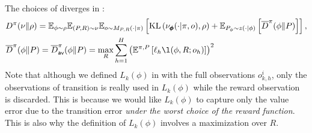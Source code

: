 \begin{algorithm}[H]
{\begin{align}
        \end{align}
    }
\end{algorithm}

The choices of diverges in : 
\begin{align}
    &D^\pi(\nu\|\rho) = \E_{\phi\sim \rho}\E_{(P,R) \sim \nu}\E_{o \sim M_{P,R}(\cdot|\pi)}\left[\KL\left(\nu_{\bo{\phi}}(\cdot|\pi, o), \rho\right) + \E_{P_\phi\sim z(\cdot|\phi)}\left[\tilD^\pi(\phi\|P) \right]\right]  ,  \label{eq:adv_div}
    \\& \tilD^\pi(\phi\|P) = \tilD_{\hbi}^\pi(\phi\|P) = \max_{R}\sum_{h=1}^H\left(\E^{\pi, P}\left[\ellest_h\l(\phi, R; o_h)\right]\right)^2  \label{eq:adv_bi_div}
\end{align}
Note that although we defined $L_k(\phi)$ in  with the full observations $o_{k,h}^i$, only the observations of transition is really used in $L_k(\phi)$ while the reward observation is discarded. This is because we would like $L_k(\phi)$ to capture only the value error due to the transition error \emph{under the worst choice of the reward function}. This is also why the definition of $L_k(\phi)$ involves a maximization over $R$. %

